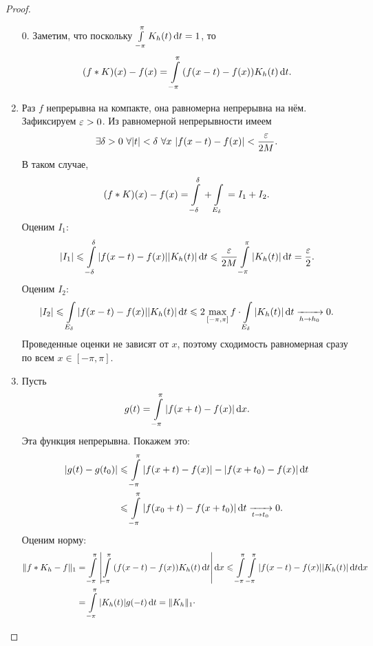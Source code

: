 \begin{proof}
    \enewline
    \begin{enumerate}
        \item[0.] Заметим, что поскольку $\int\limits_{-\pi}^\pi{K_h(t) \,\mathrm{d}t} = 1$, то
            \[
                (f \ast K)(x) - f(x) = \int\limits_{-\pi}^\pi{(f(x - t) - f(x)) K_h(t) \,\mathrm{d}t}
            .\]
        \item Раз $f$ непрерывна на компакте, она равномерна непрерывна на нём.
            Зафиксируем $\varepsilon > 0$. Из равномерной непрерывности имеем
            \[
                \exists \delta > 0~ \forall |t| < \delta~ \forall x~
                |f(x - t) - f(x)| < \frac{\varepsilon}{2M}
            .\]
            В таком случае,
            \[
                (f \ast K)(x) - f(x) = \int\limits_{-\delta}^\delta{} + \int\limits_{E_\delta} {}
                = I_1 + I_2
            .\]
            Оценим $I_1$:
            \[
                |I_1| \leqslant \int\limits_{-\delta}^\delta{|f(x - t) - f(x)| |K_h(t)| \,\mathrm{d}t}
                \leqslant \frac{\varepsilon}{2M} \int\limits_{-\pi}^\pi{|K_h(t)| \,\mathrm{d}t} = \frac{\varepsilon}{2}
            .\]
            Оценим $I_2$:
            \[
                |I_2| \leqslant \int\limits_{E_\delta}{|f(x - t) - f(x)| |K_h(t)| \,\mathrm{d} t}
                \leqslant 2 \max_{[-\pi, \pi]}{f} \cdot \int\limits_{E_\delta}{|K_h(t)| \,\mathrm{d} t}
                \xrightarrow[h \to h_0]{} 0
            .\]
            Проведенные оценки не зависят от $x$, поэтому сходимость равномерная
            сразу по всем $x \in [-\pi, \pi]$.
        \item Пусть
            \[
                g(t) = \int\limits_{-\pi}^\pi{|f(x + t) - f(x)| \,\mathrm{d}x}
            .\]
            Эта функция непрерывна. Покажем это:
            \begin{align*}
                |g(t) - g(t_0)| 
                &\leqslant \int\limits_{-\pi}^\pi{|f(x + t) - f(x)|
                - |f(x + t_0) - f(x)| \,\mathrm{d}t} \\
                &\leqslant
                \int\limits_{-\pi}^\pi{|f(x_0 + t) - f(x + t_0)| \,\mathrm{d}t}
                \xrightarrow[t \to t_0]{} 0
            .\end{align*}
            Оценим норму:
            \begin{align*}
                \norm{f \ast K_h - f}_1 
                &= \intl_{-\pi}^\pi{\abs*{\intl_{-\pi}^\pi{
                (f(x - t) - f(x)) K_h(t) \dd t}} \dd x} \leqslant
                \intl_{-\pi}^\pi{\intl_{-\pi}^\pi{|f(x - t) - f(x)| |K_h(t)| \dd t \d x}} \\
                &= \intl_{-\pi}^\pi{|K_h(t)| g(-t) \dd t} = \norm{K_h}_1 \cdot

\end{align*}
\end{enumerate}
\end{proof}
